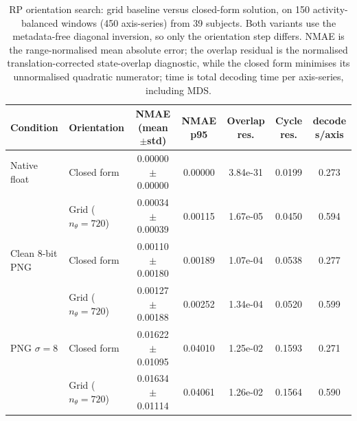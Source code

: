 \begin{table}[!htbp]
\centering
\caption{RP orientation search: grid baseline versus closed-form solution, on 150 activity-balanced windows (450 axis-series) from 39 subjects. Both variants use the metadata-free diagonal inversion, so only the orientation step differs. NMAE is the range-normalised mean absolute error; the overlap residual is the normalised translation-corrected state-overlap diagnostic, while the closed form minimises its unnormalised quadratic numerator; time is total decoding time per axis-series, including MDS.}
\label{tab:rp_orientation_ablation}
\begin{tabular}{llccccc}
\toprule
Condition & Orientation & NMAE (mean$\pm$std) & NMAE p95 & Overlap res. & Cycle res. & decode s/axis \\
\midrule
Native float & Closed form & 0.00000$\pm$0.00000 & 0.00000 & 3.84e-31 & 0.0199 & 0.273 \\
 & Grid ($n_\theta{=}720$) & 0.00034$\pm$0.00039 & 0.00115 & 1.67e-05 & 0.0450 & 0.594 \\
\midrule
Clean 8-bit PNG & Closed form & 0.00110$\pm$0.00180 & 0.00189 & 1.07e-04 & 0.0538 & 0.277 \\
 & Grid ($n_\theta{=}720$) & 0.00127$\pm$0.00188 & 0.00252 & 1.34e-04 & 0.0520 & 0.599 \\
\midrule
PNG $\sigma=8$ & Closed form & 0.01622$\pm$0.01095 & 0.04010 & 1.25e-02 & 0.1593 & 0.271 \\
 & Grid ($n_\theta{=}720$) & 0.01634$\pm$0.01114 & 0.04061 & 1.26e-02 & 0.1564 & 0.590 \\
\bottomrule
\end{tabular}
\end{table}
